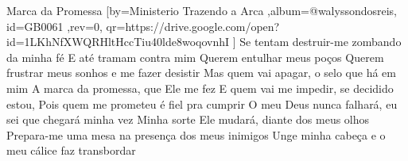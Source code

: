 \beginsong
{Marca da Promessa %
}[by={Ministerio Trazendo a Arca %
},album={@walyssondosreis},
id={GB0061 %
},rev={0}, %
qr={https://drive.google.com/open?id=1LKhNfXWQRHltHccTiu40lde8woqovnhI %
}]
\beginverse*
Se tentam destruir-me zombando da minha fé
E até tramam contra mim
Querem entulhar meus poços
Querem frustrar meus sonhos e me fazer desistir
\endverse
\beginverse*
Mas quem vai apagar, o selo que há em mim
A marca da promessa, que Ele me fez
E quem vai me impedir, se decidido estou,
Pois quem me prometeu é fiel pra cumprir
\endverse
\beginchorus
O meu Deus nunca falhará, eu sei que chegará minha vez
Minha sorte Ele mudará, diante dos meus olhos
\endchorus
\beginverse*
Prepara-me uma mesa na presença dos meus inimigos
Unge minha cabeça e o meu cálice faz transbordar
\endverse


